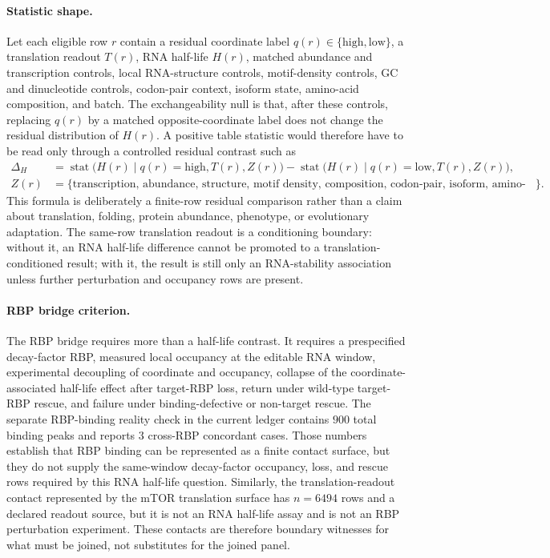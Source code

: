 \paragraph{Statistic shape.}
Let each eligible row $r$ contain a residual coordinate label $q(r) \in \{\mathrm{high},\mathrm{low}\}$, a translation readout $T(r)$, RNA half-life $H(r)$, matched abundance and transcription controls, local RNA-structure controls, motif-density controls, GC and dinucleotide controls, codon-pair context, isoform state, amino-acid composition, and batch.  The exchangeability null is that, after these controls, replacing $q(r)$ by a matched opposite-coordinate label does not change the residual distribution of $H(r)$.  A positive table statistic would therefore have to be read only through a controlled residual contrast such as
$$
\begin{aligned}
\Delta_H
  &= \operatorname{stat}\bigl(H(r) \mid q(r)=\mathrm{high}, T(r), Z(r)\bigr)
     - \operatorname{stat}\bigl(H(r) \mid q(r)=\mathrm{low}, T(r), Z(r)\bigr),\\
Z(r)
  &= \{\text{transcription, abundance, structure, motif density, composition, codon-pair, isoform, amino-acid, batch controls}\}.
\end{aligned}
$$
This formula is deliberately a finite-row residual comparison rather than a claim about translation, folding, protein abundance, phenotype, or evolutionary adaptation.  The same-row translation readout is a conditioning boundary: without it, an RNA half-life difference cannot be promoted to a translation-conditioned result; with it, the result is still only an RNA-stability association unless further perturbation and occupancy rows are present.

\paragraph{RBP bridge criterion.}
The RBP bridge requires more than a half-life contrast.  It requires a prespecified decay-factor RBP, measured local occupancy at the editable RNA window, experimental decoupling of coordinate and occupancy, collapse of the coordinate-associated half-life effect after target-RBP loss, return under wild-type target-RBP rescue, and failure under binding-defective or non-target rescue.  The separate RBP-binding reality check in the current ledger contains $900$ total binding peaks and reports $3$ cross-RBP concordant cases.  Those numbers establish that RBP binding can be represented as a finite contact surface, but they do not supply the same-window decay-factor occupancy, loss, and rescue rows required by this RNA half-life question.  Similarly, the translation-readout contact represented by the mTOR translation surface has $n=6494$ rows and a declared readout source, but it is not an RNA half-life assay and is not an RBP perturbation experiment.  These contacts are therefore boundary witnesses for what must be joined, not substitutes for the joined panel.

